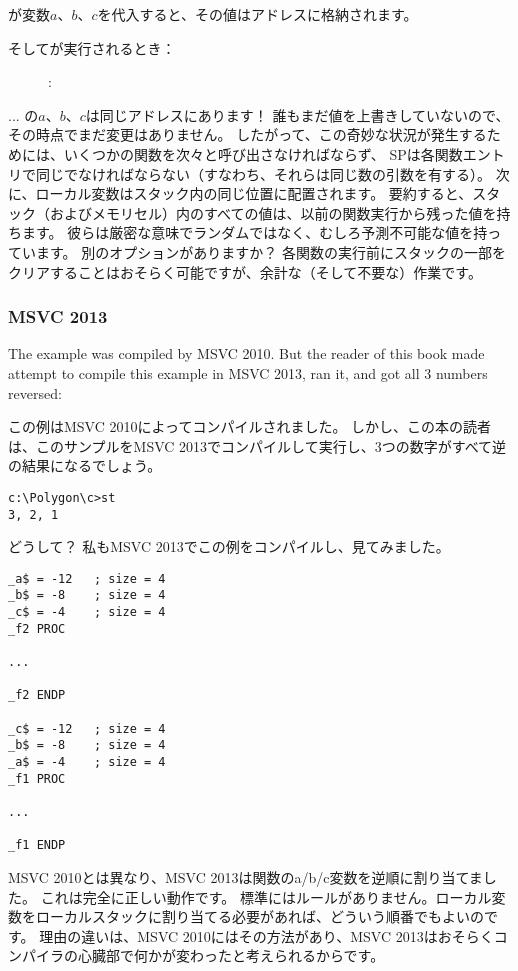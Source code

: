 が変数$a$、$b$、$c$を代入すると、その値はアドレスに格納されます。

\clearpage
そしてが実行されるとき：

\begin{figure}[H]
\centering
{}
\caption{\olly: }
\label{fig:stack_noise_olly2}
\end{figure}

... の$a$、$b$、$c$は同じアドレスにあります！
誰もまだ値を上書きしていないので、その時点でまだ変更はありません。
したがって、この奇妙な状況が発生するためには、いくつかの関数を次々と呼び出さなければならず、
\ac{SP}は各関数エントリで同じでなければならない（すなわち、それらは同じ数の引数を有する）。 
次に、ローカル変数はスタック内の同じ位置に配置されます。 
要約すると、スタック（およびメモリセル）内のすべての値は、以前の関数実行から残った値を持ちます。 
彼らは厳密な意味でランダムではなく、むしろ予測不可能な値を持っています。 
別のオプションがありますか？ 
各関数の実行前にスタックの一部をクリアすることはおそらく可能ですが、余計な（そして不要な）作業です。

\subsubsection{MSVC 2013}

The example was compiled by MSVC 2010.
But the reader of this book made attempt to compile this example in MSVC 2013, ran it, and got all 3 numbers reversed:%

この例はMSVC 2010によってコンパイルされました。
しかし、この本の読者は、このサンプルをMSVC 2013でコンパイルして実行し、3つの数字がすべて逆の結果になるでしょう。

\begin{lstlisting}
c:\Polygon\c>st
3, 2, 1
\end{lstlisting}

どうして？
私もMSVC 2013でこの例をコンパイルし、見てみました。

\begin{lstlisting}[caption=MSVC 2013,style=customasmx86]
_a$ = -12	; size = 4
_b$ = -8	; size = 4
_c$ = -4	; size = 4
_f2	PROC

...

_f2	ENDP

_c$ = -12	; size = 4
_b$ = -8	; size = 4
_a$ = -4	; size = 4
_f1	PROC

...

_f1	ENDP
\end{lstlisting}

MSVC 2010とは異なり、MSVC 2013は関数のa/b/c変数を逆順に割り当てました。
これは完全に正しい動作です。 \CCpp 標準にはルールがありません。ローカル変数をローカルスタックに割り当てる必要があれば、どういう順番でもよいのです。 
理由の違いは、MSVC 2010にはその方法があり、MSVC 2013はおそらくコンパイラの心臓部で何かが変わったと考えられるからです。

